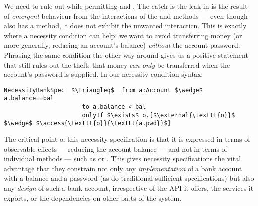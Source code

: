 We need to rule out  while permitting  and
. The catch is the leak in  is the result
of  \emph{emergent} behaviour from the interactions of the 
and  methods --- even though  also has a
 method, it does not exhibit the unwanted interaction.
This is exactly where a necessity condition can help:
we want to avoid transferring money
(or more generally, reducing an account's balance)
\textit{without} the account password.  Phrasing the same condition
the other way around gives us a positive statement that still
rules out the theft: that money \textit{can only} be
transferred when the account's password is supplied.
In our necessity condition syntax:
%
%
%
%
%
% 
 \begin{lstlisting}[language = Chainmail, mathescape=true, frame=lines]
NecessityBankSpec  $\triangleq$  from a:Account $\wedge$ a.balance==bal
                      to a.balance < bal
                      onlyIf $\exists$ o.[$\external{\texttt{o}}$ $\wedge$ $\access{\texttt{o}}{\texttt{a.pwd}}$]
\end{lstlisting}
%
%
% 
The critical point of this necessity specification is that it is
expressed in terms of observable effects --- reducing the account
balance --- and not in terms of individual methods --- such as
 or .  This gives necessity specifications the
vital advantage that they constrain not only any
\textit{implementation} of a bank account with a balance and a
password (as do traditional sufficient specifications) but also any
\textit{design} of such a bank account, irrespective of the API it
offers, the services it exports, or the dependencies on other parts of
the system.
   
